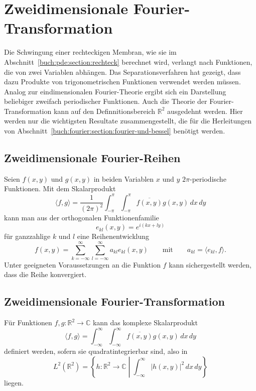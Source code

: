 %
%
%
\section{Zweidimensionale Fourier-Transformation
\label{buch:fourier:section:2d}}
Die Schwingung einer rechteckigen Membran, wie sie im
Abschnitt~\ref{buch:pde:section:rechteck} berechnet wird,
verlangt nach Funktionen, die von zwei Variablen abhängen.
Das Separationsverfahren hat gezeigt, dass dazu Produkte
von trigonometrischen Funktionen verwendet werden müssen.
Analog zur eindimensionalen Fourier-Theorie ergibt sich
ein Darstellung beliebiger zweifach periodischer Funktionen.
Auch die Theorie der Fourier-Transformation kann auf
den Definnitionsbereich $\mathbb{R}^2$ ausgedehnt werden.
Hier werden nur die wichtigsten Resultate zusammengestellt,
die für die Herleitungen von
Abschnitt~\ref{buch:fourier:section:fourier-und-bessel}
benötigt werden.

%
%
\subsection{Zweidimensionale Fourier-Reihen}
Seien $f(x,y)$ und $g(x,y)$ in beiden Variablen $x$ und $y$
$2\pi$-periodische Funktionen.
Mit dem Skalarprodukt
\[
\langle f,g\rangle
=
\frac{1}{(2\pi)^2}
\int_{-\pi}^\pi
\int_{-\pi}^\pi
\overline{f(x,y)} g(x,y)
\,dx
\,dy
\]
kann man aus der orthogonalen Funktionenfamilie
\[
e_{kl}(x,y)
=
e^{i(kx + ly)}
\]
für ganzzahlige $k$ und $l$ eine Reihenentwicklung
\[
f(x,y)
=
\sum_{k=-\infty}^\infty
\sum_{l=-\infty}^\infty
a_{kl}
e_{kl}(x,y)
\qquad\text{mit}\qquad
a_{kl}
=
\langle e_{kl},f\rangle.
\]
Unter geeigneten Voraussetzungen an die Funktion $f$ kann sichergestellt
werden, dass die Reihe konvergiert.

%
%
\subsection{Zweidimensionale Fourier-Transformation}
Für Funktionen $f,g\colon \mathbb{R}^2 \to \mathbb{C}$ kann das komplexe
Skalarprodukt
\[
\langle f,g\rangle
=
\int_{-\infty}^\infty
\int_{-\infty}^\infty
\overline{f(x,y)} g(x,y)
\,dx\,dy
\]
definiert werden, sofern sie quadratintegrierbar sind, also in
\[
L^2(\mathbb{R}^2)
=
\left\{
h\colon \mathbb{R}^2\to \mathbb{C}
\;\left|\;
\int_{-\infty}^\infty |h(x,y)|^2\,dx\,dy
\right.
\right\}
\]
%
liegen.

